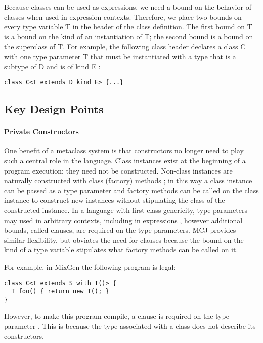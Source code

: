 \documentclass[nocopyrightspace,10pt]{acm-sigplan}
\begin{document}
Because classes can be used as expressions, we need a bound on the
behavior of classes when used in expression contexts.  Therefore, we
place two bounds on every type variable {\txt T} in the header of the
class definition. The first bound on {\txt T} is a bound on the kind
of an instantiation of {\txt T}; the second bound is a bound on the
superclass of {\txt T}. For example, the following class header
declares a class {\txt C} with one type parameter {\txt T} that must
be instantiated with a type that is a subtype of {\txt D} and is of
kind {\txt E} :

\begin{verbatim}
class C<T extends D kind E> {...}
\end{verbatim}


\subsection{Key Design Points}

\paragraph{Private Constructors}
\label{privconst}

One benefit of a metaclass system is that constructors no longer need
to play such a central role in the language. Class instances exist at
the beginning of a program execution; they need not be constructed.
Non-class instances are naturally constructed with class (factory)
methods \cite{GOF}; in this way a class instance can be passed as a
type parameter and factory methods can be called on the class instance
to construct new instances without stipulating the class of the
constructed instance.  In a language with first-class genericity, type
parameters may used in arbitrary contexts, including in 
expressions \cite{NextGen, MixGen}, however additional bounds, called
 clauses, are required on the type parameters.  MCJ provides
similar flexibility, but obviates the need for {} clauses
because the bound on the kind of a type variable stipulates what
factory methods can be called on it.

For example, in MixGen \cite{MixGen} the following program is legal:

\begin{verbatim}
class C<T extends S with T()> {
  T foo() { return new T(); }
}
\end{verbatim}

However, to make this program compile, a  clause is required
on the type parameter .  This is because the type associated
with a class does not describe its constructors.  
\end{document}
